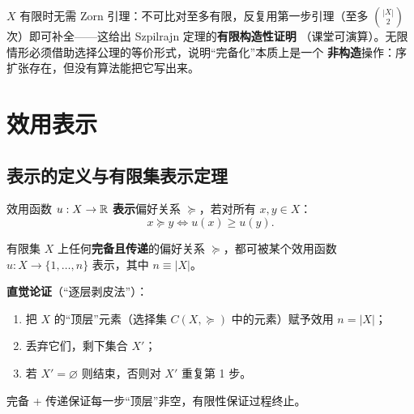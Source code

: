 \begin{remark}[构造性与非构造性]
$X$ 有限时无需 Zorn 引理：不可比对至多有限，反复用第一步引理（至多
$\binom{|X|}{2}$ 次）即可补全——这给出 Szpilrajn 定理的\textbf{有限构造性证明}
（课堂可演算）。无限情形必须借助选择公理的等价形式，说明“完备化”本质上是一个
\textbf{非构造}操作：序扩张存在，但没有算法能把它写出来。
\end{remark}

\section{效用表示}

\subsection{表示的定义与有限集表示定理}

\begin{definition}[效用表示]
效用函数 $u: X\to\mathbb{R}$ \textbf{表示}偏好关系 $\succeq$，若对所有 $x,y\in X$：
\[
x\succeq y \iff u(x)\ge u(y).
\]
\end{definition}

\begin{theorem}[有限集效用表示定理]\label{thm:finiteutility}
有限集 $X$ 上任何\textbf{完备且传递}的偏好关系 $\succeq$，都可被某个效用函数
$u: X\to\{1,\dots,n\}$ 表示，其中 $n\equiv |X|$。
\end{theorem}

\noindent\textbf{直觉论证}（“逐层剥皮法”）：
\begin{enumerate}
  \item 把 $X$ 的“顶层”元素（选择集 $C(X,\succeq)$ 中的元素）赋予效用 $n=|X|$；
  \item 丢弃它们，剩下集合 $X'$；
  \item 若 $X'=\varnothing$ 则结束，否则对 $X'$ 重复第 1 步。
\end{enumerate}
完备 + 传递保证每一步“顶层”非空，有限性保证过程终止。

